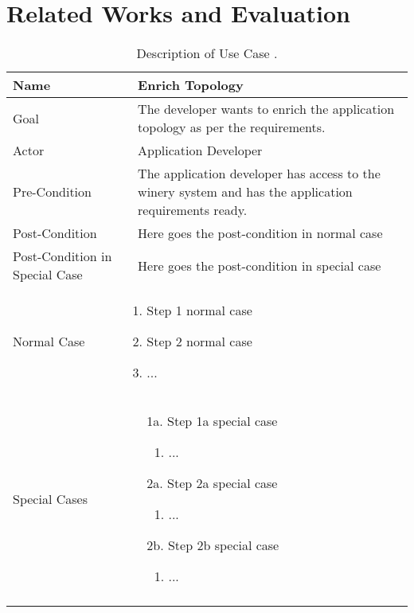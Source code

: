 \chapter{Related Works and Evaluation} \label{chap:relatedworks}

\newcommand{\usecase}[8]
{
{
\small \begin{longtable}{@{}p{.2\textwidth}p{.01\textwidth}p{.79\textwidth}@{}}
\toprule Name & & \textbf{#1} \\
\midrule Goal & & #2 \\
\midrule Actor & & #3 \\
\midrule Pre-Condition & & #4 \\
\midrule Post-Condition & & #5 \\
\midrule Post-Condition in Special Case & & #6 \\
\midrule Normal Case & \multicolumn{2}{p{.8\textwidth}}{\vspace*{-0.5cm}#7} \\
\midrule Special Cases &  \multicolumn{2}{p{.8\textwidth}}{\vspace*{-0.5cm}#8} \\
\bottomrule
\caption[Description of Use Case: #1]{Description of Use Case \term{#1}.}
\end{longtable}
}
\label{table:#1}
\clearpage
}


\usecase{Enrich Topology}
{The developer wants to enrich the application topology as per the requirements.}
{Application Developer}
{The application developer has access to the winery system and has the application requirements ready.}
{Here goes the post-condition in normal case}
{Here goes the post-condition in special case}
{\begin{enumerate}
	\item Step 1 normal case
	\item Step 2 normal case
	\item ...
\end{enumerate}}
{\begin{enumerate}
	\item[1a.] Step 1a special case
		\begin{enumerate}
			\item ...
		\end{enumerate}
	\item[2a.] Step 2a special case
		\begin{enumerate}
			\item ...
		\end{enumerate}
	\item[2b.] Step 2b special case
		\begin{enumerate}
			\item ...
		\end{enumerate}
\end{enumerate}}






